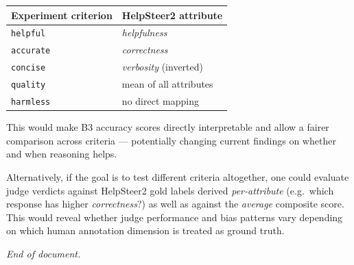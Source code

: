 \documentclass[11pt,a4paper]{article}
\begin{document}
\begin{center}
\small
\begin{tabular}{@{}ll@{}}
  \toprule
  \textbf{Experiment criterion} & \textbf{HelpSteer2 attribute} \\
  \midrule
  \texttt{helpful}  & \textit{helpfulness} \\
  \texttt{accurate} & \textit{correctness} \\
  \texttt{concise}  & \textit{verbosity} (inverted) \\
  \texttt{quality}  & mean of all attributes \\
  \texttt{harmless} & no direct mapping \\
  \bottomrule
\end{tabular}
\end{center}

This would make B3 accuracy scores directly interpretable and allow a fairer
comparison across criteria --- potentially changing current findings on whether
and when reasoning helps.

Alternatively, if the goal is to test different criteria altogether, one could
evaluate judge verdicts against HelpSteer2 gold labels derived
\textit{per-attribute} (e.g.\ which response has higher \textit{correctness}?)
as well as against the \textit{average} composite score. This would reveal
whether judge performance and bias patterns vary depending on which human
annotation dimension is treated as ground truth.


\vfill
\begin{center}
\small\textit{End of document.}
\end{center}
\end{document}
